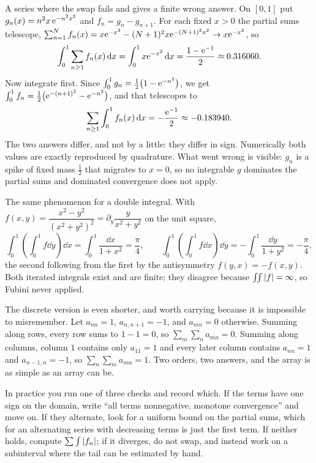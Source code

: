 \begin{worked}
A series where the swap fails and gives a finite wrong answer. On $[0,1]$ put $g_n(x)=n^{2}x\,\mathrm{e}^{-n^{2}x^{2}}$ and $f_n=g_n-g_{n+1}$. For each fixed $x>0$ the partial sums telescope, $\sum_{n=1}^{N}f_n(x)=x\mathrm{e}^{-x^{2}}-(N+1)^{2}x\mathrm{e}^{-(N+1)^{2}x^{2}}\to x\mathrm{e}^{-x^{2}}$, so
\[\int_0^1\sum_{n\geq1}f_n(x)\,\mathrm{d} x=\int_0^1x\mathrm{e}^{-x^{2}}\,\mathrm{d} x=\frac{1-\mathrm{e}^{-1}}{2}\approx0.316060.\]
Now integrate first. Since $\int_0^1 g_n=\tfrac12\bigl(1-\mathrm{e}^{-n^{2}}\bigr)$, we get $\int_0^1f_n=\tfrac12\bigl(\mathrm{e}^{-(n+1)^{2}}-\mathrm{e}^{-n^{2}}\bigr)$, and that telescopes to
\[\sum_{n\geq1}\int_0^1f_n(x)\,\mathrm{d} x=-\frac{\mathrm{e}^{-1}}{2}\approx-0.183940.\]
The two answers differ, and not by a little: they differ in sign. Numerically both values are exactly reproduced by quadrature. What went wrong is visible: $g_n$ is a spike of fixed mass $\tfrac12$ that migrates to $x=0$, so no integrable $g$ dominates the partial sums and dominated convergence does not apply.

The same phenomenon for a double integral. With $f(x,y)=\dfrac{x^{2}-y^{2}}{(x^{2}+y^{2})^{2}}=\partial_y\dfrac{y}{x^{2}+y^{2}}$ on the unit square,
\[\int_0^1\!\!\left(\int_0^1 f\dd y\right)\dd x=\int_0^1\frac{\dd x}{1+x^{2}}=\frac{\pi}{4},\qquad \int_0^1\!\!\left(\int_0^1 f\dd x\right)\dd y=-\int_0^1\frac{\dd y}{1+y^{2}}=-\frac{\pi}{4},\]
the second following from the first by the antisymmetry $f(y,x)=-f(x,y)$. Both iterated integrals exist and are finite; they disagree because $\iint\left\lvert f\right\rvert=\infty$, so Fubini never applied.

The discrete version is even shorter, and worth carrying because it is impossible to misremember. Let $a_{nn}=1$, $a_{n,n+1}=-1$, and $a_{mn}=0$ otherwise. Summing along rows, every row sums to $1-1=0$, so $\sum_m\sum_n a_{mn}=0$. Summing along columns, column $1$ contains only $a_{11}=1$ and every later column contains $a_{nn}=1$ and $a_{n-1,n}=-1$, so $\sum_n\sum_m a_{mn}=1$. Two orders, two answers, and the array is as simple as an array can be.
\end{worked}

\begin{keynote}
In practice you run one of three checks and record which. If the terms have one sign on the domain, write ``all terms nonnegative, monotone convergence'' and move on. If they alternate, look for a uniform bound on the partial sums, which for an alternating series with decreasing terms is just the first term. If neither holds, compute $\sum\int\left\lvert f_n\right\rvert$; if it diverges, do not swap, and instead work on a subinterval where the tail can be estimated by hand.
\end{keynote}

